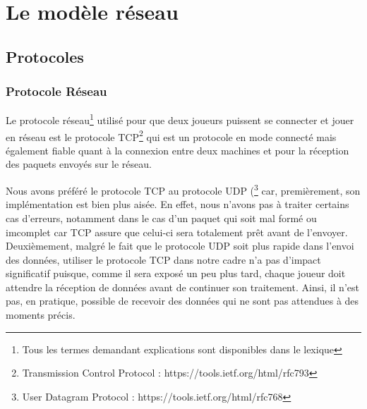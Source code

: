 \section{Le modèle réseau}

\subsection{Protocoles}
	\subsubsection{Protocole Réseau}
	Le protocole réseau\footnote{Tous les termes demandant explications sont disponibles dans le lexique} utilisé pour que deux joueurs puissent se connecter et jouer en réseau est le protocole TCP\footnote{Transmission Control Protocol : https://tools.ietf.org/html/rfc793} qui est un protocole en mode connecté mais également fiable quant à la connexion entre deux machines et pour la réception des paquets envoyés sur le réseau. \newline
	
	Nous avons préféré le protocole TCP au protocole UDP (\footnote{User Datagram Protocol : https://tools.ietf.org/html/rfc768} car, premièrement, son implémentation est bien plus aisée. En effet, nous n'avons pas à traiter certains cas d'erreurs, notamment dans le cas d'un paquet qui soit mal formé ou imcomplet car TCP assure que celui-ci sera totalement prêt avant de l'envoyer. \newline
	Deuxièmement, malgré le fait que le protocole UDP soit plus rapide dans l'envoi des données, utiliser le protocole TCP dans notre cadre n'a pas d'impact significatif puisque, comme il sera exposé un peu plus tard, chaque joueur doit attendre la réception de données avant de continuer son traitement. Ainsi, il n'est pas, en pratique, possible de recevoir des données qui ne sont pas attendues à des moments précis.

